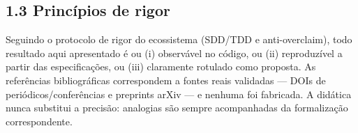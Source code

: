 \subsection*{1.3 Princípios de rigor}

 Seguindo o protocolo de rigor do ecossistema (SDD/TDD e anti-overclaim),
todo resultado aqui apresentado é ou (i) observável no código, ou (ii)
reproduzível a partir das especificações, ou (iii) claramente rotulado como
proposta. As referências bibliográficas correspondem a fontes reais validadas ---
DOIs de periódicos/conferências e preprints arXiv --- e nenhuma foi fabricada.
A didática nunca substitui a precisão: analogias são sempre acompanhadas da
formalização correspondente.
